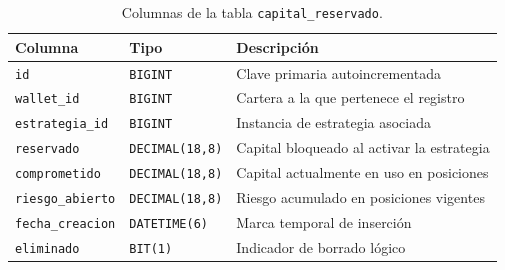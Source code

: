 \begin{table}[h]
\centering
\caption{Columnas de la tabla \texttt{capital\_reservado}.}
\label{tab:sql-capital}
\begin{tabular}{@{}llp{6.5cm}@{}}
\toprule
\textbf{Columna} & \textbf{Tipo} & \textbf{Descripción} \\
\midrule
\texttt{id}             & \texttt{BIGINT}        & Clave primaria autoincrementada \\
\texttt{wallet\_id}     & \texttt{BIGINT}        & Cartera a la que pertenece el registro \\
\texttt{estrategia\_id} & \texttt{BIGINT}        & Instancia de estrategia asociada \\
\texttt{reservado}      & \texttt{DECIMAL(18,8)} & Capital bloqueado al activar la estrategia \\
\texttt{comprometido}   & \texttt{DECIMAL(18,8)} & Capital actualmente en uso en posiciones \\
\texttt{riesgo\_abierto}& \texttt{DECIMAL(18,8)} & Riesgo acumulado en posiciones vigentes \\
\texttt{fecha\_creacion}& \texttt{DATETIME(6)}   & Marca temporal de inserción \\
\texttt{eliminado}      & \texttt{BIT(1)}        & Indicador de borrado lógico \\
\bottomrule
\end{tabular}
\end{table}

